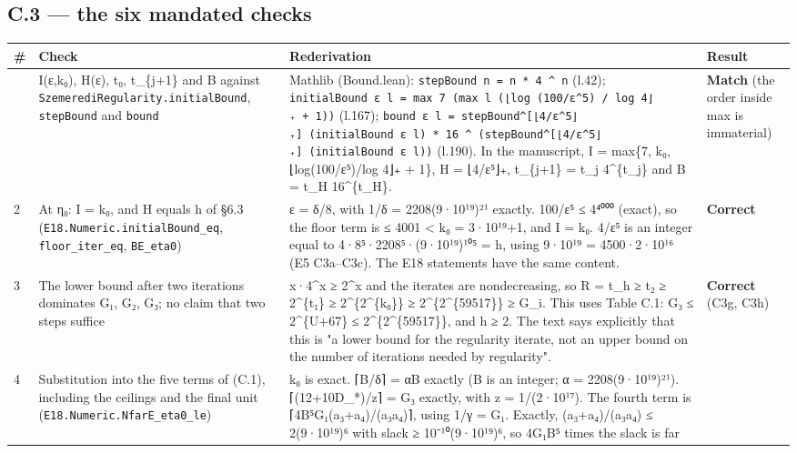 \documentclass[
]{article}
\newcounter{none} %
\begin{document}
\subsection{C.3 --- the six mandated
checks}\label{c3--the-six-mandated-checks}

{\def\LTcaptype{none} %
\begin{longtable}[]{@{}llll@{}}
\toprule\noalign{}
\# & Check & Rederivation & Result \\
\midrule\noalign{}
\endhead
\bottomrule\noalign{}
\endlastfoot
1 & I(ε,k₀), H(ε), t₀, t\_\{j+1\} and B against
\texttt{SzemerediRegularity.initialBound}, \texttt{stepBound} and
\texttt{bound} & Mathlib (Bound.lean):
\texttt{stepBound\ n\ =\ n\ *\ 4\ \^{}\ n} (l.42);
\texttt{initialBound\ ε\ l\ =\ max\ 7\ (max\ l\ (⌊log\ (100/ε\^{}5)\ /\ log\ 4⌋₊\ +\ 1))}
(l.167);
\texttt{bound\ ε\ l\ =\ stepBound\^{}{[}⌊4/ε\^{}5⌋₊{]}\ (initialBound\ ε\ l)\ *\ 16\ \^{}\ (stepBound\^{}{[}⌊4/ε\^{}5⌋₊{]}\ (initialBound\ ε\ l))}
(l.190). In the manuscript, I = max\{7, k₀, ⌊log(100/ε⁵)/log 4⌋₊ + 1\},
H = ⌊4/ε⁵⌋₊, t\_\{j+1\} = t\_j 4\^{}\{t\_j\} and B = t\_H
16\^{}\{t\_H\}. & \textbf{Match} (the order inside max is immaterial) \\
2 & At η₀: I = k₀, and H equals h of §6.3
(\texttt{E18.Numeric.initialBound\_eq}, \texttt{floor\_iter\_eq},
\texttt{BE\_eta0}) & ε = δ/8, with 1/δ = 2208(9·10¹⁹)²¹ exactly. 100/ε⁵
≤ 4⁴⁰⁰⁰ (exact), so the floor term is ≤ 4001 \textless{} k₀ = 3·10¹⁹+1,
and I = k₀. 4/ε⁵ is an integer equal to 4·8⁵·2208⁵·(9·10¹⁹)¹⁰⁵ = h,
using 9·10¹⁹ = 4500·2·10¹⁶ (E5 C3a--C3c). The E18 statements have the
same content. & \textbf{Correct} \\
3 & The lower bound after two iterations dominates G₁, G₂, G₃; no claim
that two steps suffice & x·4\^{}x ≥ 2\^{}x and the iterates are
nondecreasing, so R = t\_h ≥ t₂ ≥ 2\^{}\{t₁\} ≥ 2\^{}\{2\^{}\{k₀\}\} ≥
2\^{}\{2\^{}\{59517\}\} ≥ G\_i. This uses Table C.1: G₃ ≤ 2\^{}\{U+67\}
≤ 2\^{}\{2\^{}\{59517\}\}, and h ≥ 2. The text says explicitly that this
is "a lower bound for the regularity iterate, not an upper bound on the
number of iterations needed by regularity". & \textbf{Correct} (C3g,
C3h) \\
4 & Substitution into the five terms of (C.1), including the ceilings
and the final unit (\texttt{E18.Numeric.NfarE\_eta0\_le}) & k₀ is exact.
⌈B/δ⌉ = αB exactly (B is an integer; α = 2208(9·10¹⁹)²¹).
⌈(12+10D\_*)/z⌉ = G₃ exactly, with z = 1/(2·10¹⁷). The fourth term is
⌈4B⁵G₁(a₃+a₄)/(a₃a₄)⌉, using 1/γ = G₁. Exactly, (a₃+a₄)/(a₃a₄) ≤
2(9·10¹⁹)⁶ with slack ≥ 10⁻¹⁰(9·10¹⁹)⁶, so 4G₁B⁵ times the slack is far

\end{longtable}}
\end{document}
